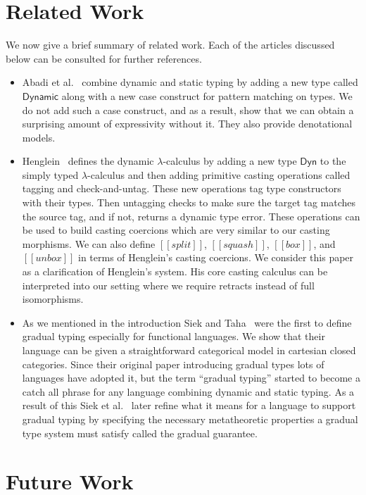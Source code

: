 \documentclass[sigplan]{acmart}\settopmatter{printfolios=true}
\begin{document}
\section{Related Work}
\label{sec:related_work}
We now give a brief summary of related
work. Each of the articles discussed below can be consulted for
further references.
\begin{itemize}
\item Abadi et al.~\cite{Abadi:1989} combine dynamic and static typing
  by adding a new type called $\mathsf{Dynamic}$ along with a new case
  construct for pattern matching on types.  We do not add such a case
  construct, and as a result, show that we can obtain a surprising
  amount of expressivity without it.  They also provide denotational
  models.

\item Henglein~\cite{Henglein:1994} defines the dynamic
  $\lambda$-calculus by adding a new type $\mathsf{Dyn}$ to the simply
  typed $\lambda$-calculus and then adding primitive casting
  operations called tagging and check-and-untag.  These new operations
  tag type constructors with their types.  Then untagging checks to
  make sure the target tag matches the source tag, and if not, returns
  a dynamic type error.  These operations can be used to build casting
  coercions which are very similar to our casting morphisms. We can
  also define $[[split]]$, $[[squash]]$, $[[box]]$, and $[[unbox]]$ in
  terms of Henglein's casting coercions.  We consider this paper as a
  clarification of Henglein's system.  His core casting calculus can
  be interpreted into our setting where we require retracts instead of
  full isomorphisms.

\item As we mentioned in the introduction Siek and
  Taha~\cite{Siek:2006} were the first to define gradual typing
  especially for functional languages.  We show that their language
  can be given a straightforward categorical model in cartesian closed
  categories.  Since their original paper introducing gradual types
  lots of languages have adopted it, but the term ``gradual typing''
  started to become a catch all phrase for any language combining
  dynamic and static typing.  As a result of this Siek et
  al.~\cite{Siek:2015} later refine what it means for a language to
  support gradual typing by specifying the necessary metatheoretic
  properties a gradual type system must satisfy called the gradual
  guarantee.

\end{itemize}


\section{Future Work}
\label{sec:conclusion}




\appendix





\end{document}
